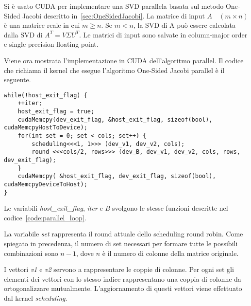 Si è usato CUDA per implementare una SVD parallela basata sul metodo One-Sided Jacobi descritto in~\ref{sec:OneSidedJacobi}. La matrice di input $A \quad (m \times n)$ è una matrice reale in cui $m \geq n$. Se $m < n$, la SVD di A può essere calcolata dalla SVD di $A^T = V \Sigma U^T$. Le matrici di input sono salvate in column-major order e single-precision floating point. \cite{Romer:SVD}

Viene ora mostrata l'implementazione in CUDA dell'algoritmo parallel. Il codice che richiama il kernel che esegue l'algoritmo One-Sided Jacobi parallel è il seguente.
\begin{lstlisting}[caption=Loop algoritmo parallelo,label=code:parallel_loop]
while(!host_exit_flag) {
	++iter;
	host_exit_flag = true; 
	cudaMemcpy(dev_exit_flag, &host_exit_flag, sizeof(bool), cudaMemcpyHostToDevice);
	for(int set = 0; set < cols; set++) {
		scheduling<<<1, 1>>> (dev_v1, dev_v2, cols);
		round <<<cols/2, rows>>> (dev_B, dev_v1, dev_v2, cols, rows, dev_exit_flag);		
	}
	cudaMemcpy( &host_exit_flag, dev_exit_flag, sizeof(bool), cudaMemcpyDeviceToHost);
}
\end{lstlisting}
Le variabili \textit{host\_exit\_flag}, \textit{iter} e \textit{B} svolgono le stesse funzioni descritte nel codice~\ref{code:parallel_loop}.

La variabile \textit{set} rappresenta il round attuale dello scheduling round robin. Come spiegato in precedenza, il numero di set necessari per formare tutte le possibili combinazioni sono $n-1$, dove $n$ è il numero di colonne della matrice originale.

I vettori \textit{v1} e  \textit{v2} servono a rappresentare le coppie di colonne. Per ogni set gli elementi dei vettori con lo stesso indice rappresentano una coppia di colonne da ortogonalizzare mutualmente. L'aggiornamento di questi vettori viene effettuato dal kernel \textit{scheduling}.

